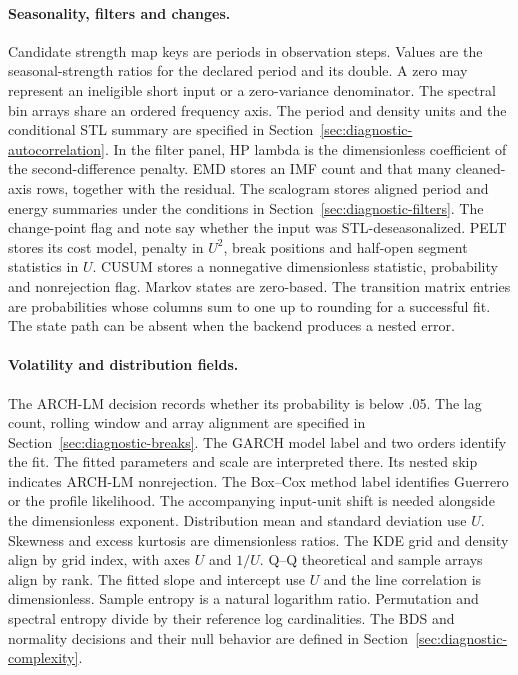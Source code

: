 \paragraph{Seasonality, filters and changes.}
Candidate strength map keys are periods in observation steps. Values
are the seasonal-strength ratios for the declared period and its
double. A zero may represent an ineligible short input or a
zero-variance denominator. The spectral bin arrays share an ordered
frequency axis. The period and density units and the conditional STL
summary are specified in Section~\ref{sec:diagnostic-autocorrelation}.
In the filter panel, HP lambda is the dimensionless coefficient of the
second-difference penalty. EMD stores an IMF count and that many
cleaned-axis rows, together with the residual. The scalogram stores
aligned period and energy summaries under the conditions in
Section~\ref{sec:diagnostic-filters}.
The change-point flag and note say whether the input was
STL-deseasonalized. PELT stores its cost model, penalty in $U^2$,
break positions and half-open segment statistics in $U$. CUSUM
stores a nonnegative dimensionless statistic, probability and
nonrejection flag. Markov states are zero-based. The transition
matrix entries are probabilities whose columns sum to one up to
rounding for a successful fit. The state path can be absent when
the backend produces a nested error.

\paragraph{Volatility and distribution fields.}
The ARCH-LM decision records whether its probability is below .05.
The lag count, rolling window and array alignment are specified in
Section~\ref{sec:diagnostic-breaks}. The GARCH model label and two
orders identify the fit. The fitted parameters and scale are
interpreted there. Its nested skip indicates ARCH-LM nonrejection.
The Box--Cox method label identifies Guerrero or the profile
likelihood. The accompanying input-unit shift is needed alongside
the dimensionless exponent.
Distribution mean and standard deviation use $U$. Skewness and
excess kurtosis are dimensionless ratios. The KDE grid and density
align by grid index, with axes $U$ and $1/U$. Q--Q theoretical and
sample arrays align by rank. The fitted slope and intercept use $U$
and the line correlation is dimensionless. Sample entropy is a
natural logarithm ratio. Permutation and spectral entropy divide
by their reference log cardinalities. The BDS and normality
decisions and their null behavior are defined in
Section~\ref{sec:diagnostic-complexity}.

